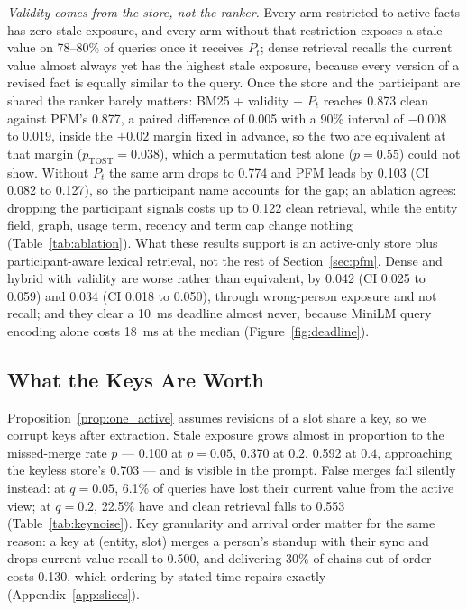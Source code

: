 \documentclass{article} %
\begin{document}
\emph{Validity comes from the store, not the ranker.} Every arm restricted to active facts has zero stale exposure, and every arm without that restriction exposes a stale value on 78--80\% of queries once it receives $P_t$; dense retrieval recalls the current value almost always yet has the highest stale exposure, because every version of a revised fact is equally similar to the query. Once the store and the participant are shared the ranker barely matters: BM25 + validity + $P_t$ reaches 0.873 clean against PFM's 0.877, a paired difference of 0.005 with a 90\% interval of $-$0.008 to 0.019, inside the $\pm0.02$ margin fixed in advance, so the two are equivalent at that margin ($p_{\mathrm{TOST}}=0.038$), which a permutation test alone ($p=0.55$) could not show. Without $P_t$ the same arm drops to 0.774 and PFM leads by 0.103 (CI 0.082 to 0.127), so the participant name accounts for the gap; an ablation agrees: dropping the participant signals costs up to 0.122 clean retrieval, while the entity field, graph, usage term, recency and term cap change nothing (Table~\ref{tab:ablation}). What these results support is an active-only store plus participant-aware lexical retrieval, not the rest of Section~\ref{sec:pfm}. Dense and hybrid with validity are worse rather than equivalent, by 0.042 (CI 0.025 to 0.059) and 0.034 (CI 0.018 to 0.050), through wrong-person exposure and not recall; and they clear a 10~ms deadline almost never, because MiniLM query encoding alone costs 18~ms at the median (Figure~\ref{fig:deadline}).

\subsection{What the Keys Are Worth}
\label{sec:keynoise}


Proposition~\ref{prop:one_active} assumes revisions of a slot share a key, so we corrupt keys after extraction. Stale exposure grows almost in proportion to the missed-merge rate $p$ --- 0.100 at $p{=}0.05$, 0.370 at $0.2$, 0.592 at $0.4$, approaching the keyless store's 0.703 --- and is visible in the prompt. False merges fail silently instead: at $q{=}0.05$, 6.1\% of queries have lost their current value from the active view; at $q{=}0.2$, 22.5\% have and clean retrieval falls to 0.553 (Table~\ref{tab:keynoise}). Key granularity and arrival order matter for the same reason: a key at (entity, slot) merges a person's standup with their sync and drops current-value recall to 0.500, and delivering 30\% of chains out of order costs 0.130, which ordering by stated time repairs exactly (Appendix~\ref{app:slices}).
\end{document}
